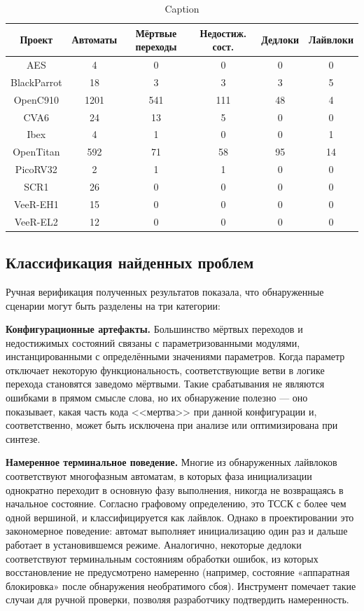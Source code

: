 \begin{table}[h!]
    \centering
    \begin{tabular}{|c|c|c|c|c|c|}
        \hline
        Проект & Автоматы & Мёртвые переходы & Недостиж. сост. & Дедлоки & Лайвлоки \\ \hline
        AES & 4 & 0 & 0 & 0 & 0 \\ \hline
        BlackParrot & 18 & 3 & 3 & 3 & 5 \\ \hline
        OpenC910 & 1201 & 541 & 111 & 48 & 4 \\ \hline
        CVA6 & 24 & 13 & 5 & 0 & 0 \\ \hline
        Ibex & 4 & 1 & 0 & 0 & 1 \\ \hline
        OpenTitan & 592 & 71 & 58 & 95 & 14 \\ \hline
        PicoRV32 & 2 & 1 & 1 & 0 & 0 \\ \hline
        SCR1 & 26 & 0 & 0 & 0 & 0 \\ \hline
        VeeR-EH1 & 15 & 0 & 0 & 0 & 0 \\ \hline
        VeeR-EL2 & 12 & 0 & 0 & 0 & 0 \\ \hline
    \end{tabular}
    \caption{Caption}
    \label{tab:placeholder}
\end{table}

\subsection{Классификация найденных проблем}

Ручная верификация полученных результатов показала, что обнаруженные сценарии могут быть разделены на три категории:

\textbf{Конфигурационные артефакты.} Большинство мёртвых переходов и недостижимых состояний связаны с
параметризованными модулями, инстанцированными с определёнными значениями параметров. Когда параметр
отключает некоторую функциональность, соответствующие ветви в логике перехода становятся заведомо
мёртвыми. Такие срабатывания не являются ошибками в прямом смысле слова, но их обнаружение
полезно --- оно показывает, какая часть кода <<мертва>> при данной конфигурации и, соответственно, может
быть исключена при анализе или оптимизирована при синтезе.

\textbf{Намеренное терминальное поведение.} Многие из обнаруженных лайвлоков соответствуют многофазным
автоматам, в которых фаза инициализации однократно переходит в основную фазу выполнения, никогда не возвращаясь
в начальное состояние. Согласно графовому определению, это ТССК с более чем одной вершиной, и
классифицируется как лайвлок. Однако в проектировании это закономерное поведение: автомат выполняет
инициализацию один раз и дальше работает в установившемся режиме. Аналогично, некоторые дедлоки
соответствуют терминальным состояниям обработки ошибок, из которых восстановление не предусмотрено
намеренно (например, состояние «аппаратная блокировка» после обнаружения необратимого сбоя).
Инструмент помечает такие случаи для ручной проверки, позволяя разработчику подтвердить намеренность.

